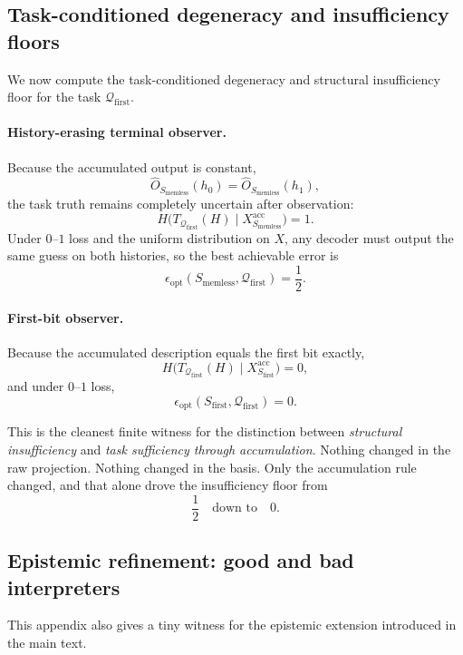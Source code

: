 \documentclass[11pt,twoside]{article}
\theoremstyle{definition}
\newcommand{\acc}{\mathrm{acc}}
\begin{document}
\subsection{Task-conditioned degeneracy and insufficiency floors}
\label{app:memory-task-conditioned-degeneracy}

We now compute the task-conditioned degeneracy and structural insufficiency floor for the task \(\mathcal{Q}_{\mathrm{first}}\).

\paragraph{History-erasing terminal observer.}
Because the accumulated output is constant,
\[
  \widehat{O}_{S_{\mathrm{memless}}}(h_0)
  =
  \widehat{O}_{S_{\mathrm{memless}}}(h_1),
\]
the task truth remains completely uncertain after observation:
\[
  H\!\bigl(T_{\mathcal{Q}_{\mathrm{first}}}(H)\mid
  X_{S_{\mathrm{memless}}}^{\acc}\bigr)=1.
\]
Under \(0\)--\(1\) loss and the uniform distribution on \(X\), any decoder must output the same guess on both histories, so the best achievable error is
\[
  \epsilon_{\mathrm{opt}}(S_{\mathrm{memless}},
  \mathcal{Q}_{\mathrm{first}})
  = \frac12.
\]

\paragraph{First-bit observer.}
Because the accumulated description equals the first bit exactly,
\[
  H\!\bigl(T_{\mathcal{Q}_{\mathrm{first}}}(H)\mid
  X_{S_{\mathrm{first}}}^{\acc}\bigr)=0,
\]
and under \(0\)--\(1\) loss,
\[
  \epsilon_{\mathrm{opt}}(S_{\mathrm{first}},
  \mathcal{Q}_{\mathrm{first}})
  = 0.
\]

This is the cleanest finite witness for the distinction between \emph{structural insufficiency} and \emph{task sufficiency through accumulation}. Nothing changed in the raw projection. Nothing changed in the basis. Only the accumulation rule changed, and that alone drove the insufficiency floor from
\[
  \frac12
  \quad\text{down to}\quad
  0.
\]

\subsection{Epistemic refinement: good and bad interpreters}
\label{app:memory-epistemic-refinement}

This appendix also gives a tiny witness for the epistemic extension introduced in the main text.
\end{document}

